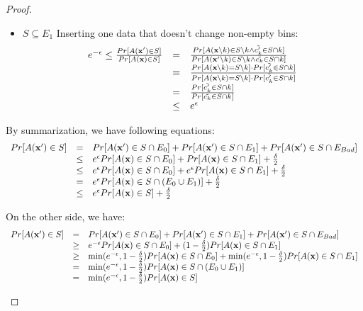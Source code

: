 \documentclass[11pt]{article}
\begin{document}
\begin{proof}
\begin{itemize}
\begin{itemize}
\item $S \subseteq E_{1}$ Inserting one data that doesn't change non-empty bins:
\[
	\begin{array}{rcl}
	e^{-\epsilon} \leq \frac{Pr[A(\mathbf{x}') \in S]}
	{Pr[A(\mathbf{x}) \in S]}
	& = & 
	\frac{Pr[A(\mathbf{x} \setminus k) \in S\setminus k 
	\land \tilde{c'_k} \in S \cap k]}
	{Pr[A(\mathbf{x}' \setminus k) \in S\setminus k 
	\land \tilde{c_k} \in S \cap k]}\\
	& = &
	\frac{Pr[A(\mathbf{x} \setminus k) = S\setminus k ] 
	\cdot Pr[\tilde{c'_k} \in S \cap k]}
	{Pr[A(\mathbf{x} \setminus k) = S\setminus k ] 
	\cdot Pr[\tilde{c'_k} \in S \cap k]}\\
	& = &
	\frac{Pr[ \tilde{c_k'} \in S \cap k]}
	{Pr[\tilde{c_k} \in S \cap k]}\\
	& \leq &
	e^{\epsilon}
	\end{array}
\]
\end{itemize}
By summarization, we have following equations:
%
\[
	\begin{array}{rcl}
	Pr[A(\mathbf{x}') \in S] & = & Pr[A(\mathbf{x}') \in S \cap E_0] + Pr[A(\mathbf{x}') \in S \cap E_1] + Pr[A(\mathbf{x}') \in S \cap E_{Bad}]\\
	& \leq & e^{\epsilon} Pr[A(\mathbf{x}) \in S \cap E_0] 
	+  Pr[A(\mathbf{x}) \in S \cap E_1] 
	+ \frac{\delta}{2}\\
	& \leq & e^{\epsilon} Pr[A(\mathbf{x}) \in S\cap E_0] 
	+ e^{\epsilon} Pr[A(\mathbf{x}) \in S\cap E_1] 
	+ \frac{\delta}{2}\\
	& = & e^{\epsilon} Pr[A(\mathbf{x}) \in S\cap (E_0 \cup E_1)] 
	+ \frac{\delta}{2}\\
	& \leq &
	e^{\epsilon} Pr[A(\mathbf{x}) \in S] 
	+ \frac{\delta}{2}\\
	\end{array}
\]

On the other side, we have:
\[
	\begin{array}{rcl}
	Pr[A(\mathbf{x}') \in S] & = & Pr[A(\mathbf{x}') \in S \cap E_0] + Pr[A(\mathbf{x}') \in S \cap E_1] + Pr[A(\mathbf{x}') \in S \cap E_{Bad}]\\
	&\geq & e^{-\epsilon} Pr[A(\mathbf{x}) \in S \cap E_0] 
	+  (1 - \frac{\delta}{2})Pr[A(\mathbf{x}) \in S \cap E_1] \\
	& \geq & \min(e^{-\epsilon}, 1 - \frac{\delta}{2}) 
	Pr[A(\mathbf{x}) \in S\cap E_0] 
	+ \min(e^{-\epsilon}, 1 - \frac{\delta}{2})
	Pr[A(\mathbf{x}) \in S\cap E_1]\\
	& = & \min(e^{-\epsilon}, 1 - \frac{\delta}{2}) Pr[A(\mathbf{x}) \in S\cap (E_0 \cup E_1)] \\
	& = &
	\min(e^{-\epsilon}, 1 - \frac{\delta}{2})
	Pr[A(\mathbf{x}) \in S] \\
	\end{array}
\]



\end{itemize}
\end{proof}
\end{document}
